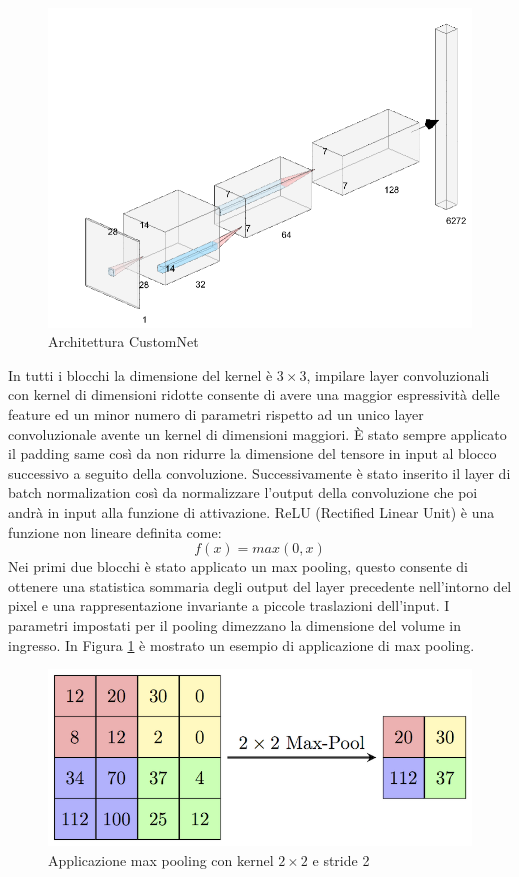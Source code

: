 \begin{figure}[!hbt]
    \centering
    \includegraphics[width=\columnwidth]{images/CustomNetArchitecture.png}
    \caption{Architettura CustomNet}
    \label{fig4:custom_net_architecture}
\end{figure}
In tutti i blocchi la dimensione del kernel è $3\times3$, impilare layer convoluzionali con kernel di dimensioni ridotte consente di avere una maggior espressività delle feature ed un minor numero di parametri rispetto ad un unico layer convoluzionale avente un kernel di dimensioni maggiori. \`{E} stato sempre applicato il padding same  così da non ridurre la dimensione del tensore in input al blocco successivo a seguito della convoluzione. Successivamente è stato inserito il layer di batch normalization così da normalizzare l'output della convoluzione che poi andrà in input alla funzione di attivazione. ReLU (Rectified Linear Unit) è una funzione non lineare definita come:
$$f(x) = max(0,x)$$
Nei primi due blocchi è stato applicato un max pooling, questo consente di ottenere una statistica sommaria degli output del layer precedente nell'intorno del pixel e una rappresentazione invariante a piccole traslazioni dell'input. I parametri impostati per il pooling dimezzano la dimensione del volume in ingresso. In Figura \ref{fig4:custom_net_architecture} è mostrato un esempio di applicazione di max pooling.
\begin{figure}[!hbt]
    \centering
    \includegraphics[width=\columnwidth]{images/MaxPoolSample2.png}
    \caption{Applicazione max pooling con kernel $2\times2$ e stride 2}
    \label{fig5:max_pooling}
\end{figure}
